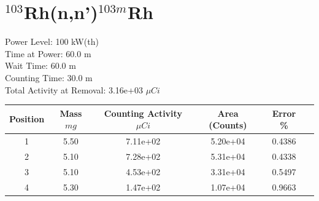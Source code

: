 \newpage

\section*{ $^{103}$Rh(n,n')$^{103m}$Rh }

Power Level: 100 kW(th) \\
Time at Power: 60.0 m \\
Wait Time: 60.0 m \\
Counting Time: 30.0 m \\
Total Activity at Removal: 3.16e+03 $\mu Ci$

\begin{table}[h]
\centering
\begin{tabular}{ |c|c|c|c|c|c| }
 \hline
 Position & Mass $mg$ & Counting Activity $\mu Ci$ & Area (Counts) & Error \% \\
 \hline 
 1 & 5.50 & 7.11e+02 & 5.20e+04 & 0.4386 \\ 
\hline
 2 & 5.10 & 7.28e+02 & 5.31e+04 & 0.4338 \\ 
\hline
 3 & 5.10 & 4.53e+02 & 3.31e+04 & 0.5497 \\ 
\hline
 4 & 5.30 & 1.47e+02 & 1.07e+04 & 0.9663 \\ 
\hline
\end{tabular}
\end{table}

